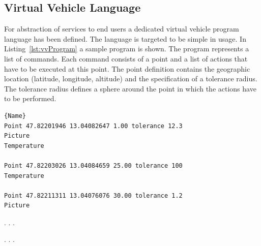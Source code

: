 \subsection{Virtual Vehicle Language}

For abstraction of services to end users a dedicated virtual vehicle program language has been defined. The language is targeted to be simple in usage. In Listing~\ref{lst:vvProgram} a sample program is shown. The program represents a list of commands. Each command consists of a point and a list of actions that have to be executed at this point. The point definition contains the geographic location (latitude, longitude, altitude) and the specification of a tolerance radius. The tolerance radius defines a sphere around the point in which the actions have to be performed.

\begin{lstlisting}[caption={Virtual Vehicle Sample Program},mathescape=true,label=lst:vvProgram]{Name}
Point 47.82201946 13.04082647 1.00 tolerance 12.3
Picture
Temperature

Point 47.82203026 13.04084659 25.00 tolerance 100
Temperature

Point 47.82211311 13.04076076 30.00 tolerance 1.2
Picture
\end{lstlisting}

. . .

. . .

